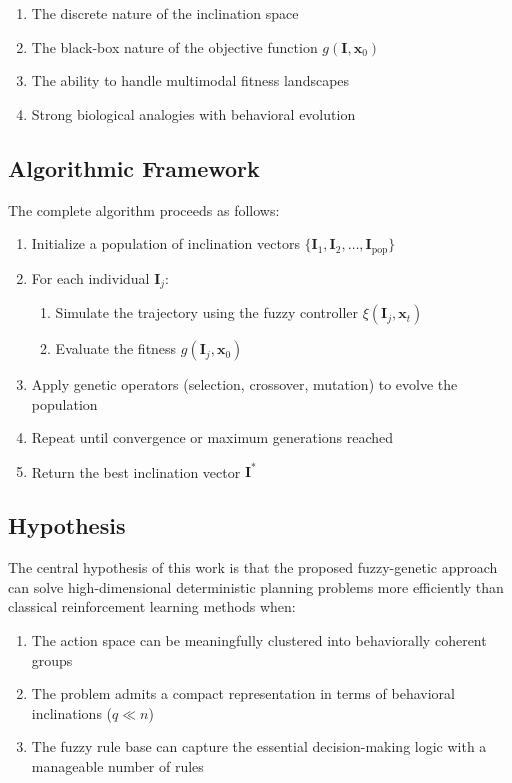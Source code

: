 \documentclass[11pt, a4paper]{article}
\begin{document}
\begin{enumerate}
    \item The discrete nature of the inclination space
    \item The black-box nature of the objective function $g(\mathbf{I}, \mathbf{x}_0)$
    \item The ability to handle multimodal fitness landscapes
    \item Strong biological analogies with behavioral evolution
\end{enumerate}

\subsection{Algorithmic Framework}

The complete algorithm proceeds as follows:

\begin{enumerate}
    \item Initialize a population of inclination vectors $\{\mathbf{I}_1, \mathbf{I}_2, \ldots, \mathbf{I}_{\text{pop}}\}$
    \item For each individual $\mathbf{I}_j$:
    \begin{enumerate}
        \item Simulate the trajectory using the fuzzy controller $\xi(\mathbf{I}_j, \mathbf{x}_t)$
        \item Evaluate the fitness $g(\mathbf{I}_j, \mathbf{x}_0)$
    \end{enumerate}
    \item Apply genetic operators (selection, crossover, mutation) to evolve the population
    \item Repeat until convergence or maximum generations reached
    \item Return the best inclination vector $\mathbf{I}^*$
\end{enumerate}

\subsection{Hypothesis}

The central hypothesis of this work is that the proposed fuzzy-genetic approach can solve high-dimensional deterministic planning problems more efficiently than classical reinforcement learning methods when:

\begin{enumerate}
    \item The action space can be meaningfully clustered into behaviorally coherent groups
    \item The problem admits a compact representation in terms of behavioral inclinations ($q \ll n$)
    \item The fuzzy rule base can capture the essential decision-making logic with a manageable number of rules
\end{enumerate}
\end{document}
